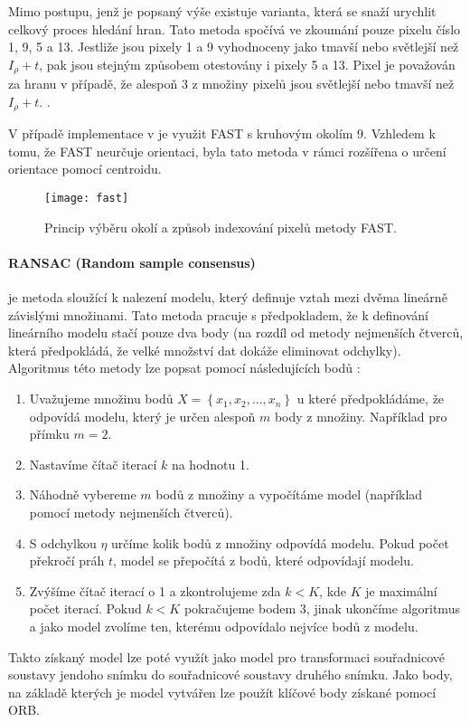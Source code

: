Mimo postupu, jenž je popsaný výše existuje varianta, která se snaží urychlit  celkový proces hledání hran. Tato metoda spočívá ve zkoumání pouze pixelu číslo 1, 9, 5 a 13. Jestliže jsou pixely 1 a 9 vyhodnoceny jako tmavší nebo světlejší než $I_\rho + t$, pak jsou stejným způsobem otestovány i pixely 5 a 13. Pixel je považován za hranu v případě, že alespoň 3 z množiny pixelů jsou světlejší nebo tmavší než $I_\rho + t$. \cite{rosten_2008_faster}.

V případě implementace v  je využit FAST s kruhovým okolím 9. Vzhledem k tomu, že FAST neurčuje orientaci, byla tato metoda v rámci  rozšířena o určení orientace pomocí centroidu. \cite{orb}

\begin{figure}[htb]
\centering
\texttt{[image: fast]}
\caption{Princip výběru okolí a způsob indexování pixelů metody FAST. \cite{rosten_2008_faster}}
\label{fig:fast}
\end{figure}

\paragraph{RANSAC (Random sample consensus)} je metoda sloužící k nalezení modelu, který definuje vztah mezi dvěma lineárně závislými množinami. Tato metoda pracuje s předpokladem, že k definování lineárního modelu stačí pouze dva body (na rozdíl od metody nejmenších čtverců, která předpokládá, že velké množství dat dokáže eliminovat odchylky). Algoritmus této metody lze popsat pomocí následujících bodů \cite[str.~462]{Image-Processing-Analysis-and-Machine-Vision}:
\begin{enumerate}
\item Uvažujeme množinu bodů $X = \left\{x_1, x_2, ..., x_n \right\}$ u které předpokládáme, že odpovídá modelu, který je určen alespoň $m$ body z množiny. Například pro přímku $m = 2$.
\item Nastavíme čítač iterací $k$ na hodnotu 1.
\item Náhodně vybereme $m$ bodů z množiny a vypočítáme model (například pomocí metody nejmenších čtverců).
\item S odchylkou $\eta$ určíme kolik bodů z množiny odpovídá modelu. Pokud počet překročí práh $t$, model se přepočítá z bodů, které odpovídají modelu.
\item Zvýšíme čítač iterací o 1 a zkontrolujeme zda $k < K$, kde $K$ je maximální počet iterací. Pokud $k < K$ pokračujeme bodem 3, jinak ukončíme algoritmus a jako model zvolíme ten, kterému odpovídalo nejvíce bodů z modelu.
\end{enumerate}
Takto získaný model lze poté využít jako model pro transformaci souřadnicové soustavy jendoho snímku do souřadnicové soustavy druhého snímku. Jako body, na základě kterých je model vytvářen lze použít klíčové body získané pomocí ORB. 


